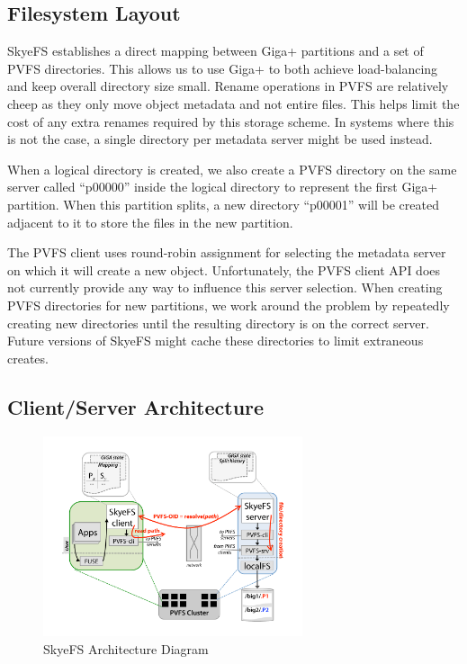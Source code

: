 \documentclass[twocolumn,letterpaper]{article}
\begin{document}
\subsection{Filesystem Layout}
SkyeFS establishes a direct mapping between Giga+ partitions and a set of PVFS
directories.  This allows us to use Giga+ to both achieve load-balancing and
keep overall directory size small.  Rename operations in PVFS are relatively
cheep as they only move object metadata and not entire files.  This helps limit
the cost of any extra renames required by this storage scheme.  In systems
where this is not the case, a single directory per metadata server might be
used instead.

When a logical directory is created, we also create a PVFS directory on the
same server called ``p00000'' inside the logical directory to represent the
first Giga+ partition.  When this partition splits, a new directory ``p00001''
will be created adjacent to it to store the files in the new partition.  

The PVFS client uses round-robin assignment for selecting the metadata server
on which it will create a new  object.  Unfortunately, the PVFS client API
does not currently provide any way to influence this server selection.  When
creating PVFS directories for new partitions, we work around the problem by
repeatedly creating new directories until the resulting directory is on the
correct server.  Future versions of SkyeFS might cache these directories to
limit extraneous creates.

\subsection{Client/Server Architecture}
\begin{figure}
\begin{center}
\includegraphics[width=3in]{figure-architecture}
\end{center}
\caption{SkyeFS Architecture Diagram}
\end{figure}
\end{document}
